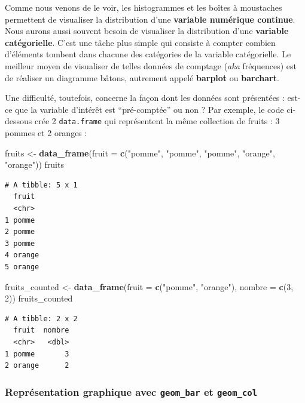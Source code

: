 \documentclass[
  a4paper,
]{article}
\newenvironment{Shaded}{\begin{snugshade}}{\end{snugshade}}
\newcommand{\DataTypeTok}[1]{\textcolor[rgb]{0.00,0.34,0.68}{#1}}
\newcommand{\DecValTok}[1]{\textcolor[rgb]{0.69,0.50,0.00}{#1}}
\newcommand{\KeywordTok}[1]{\textcolor[rgb]{0.12,0.11,0.11}{\textbf{#1}}}
\newcommand{\NormalTok}[1]{\textcolor[rgb]{0.12,0.11,0.11}{#1}}
\newcommand{\StringTok}[1]{\textcolor[rgb]{0.75,0.01,0.01}{#1}}
\begin{document}
Comme nous venons de le voir, les histogrammes et les boîtes à moustaches permettent de visualiser la distribution d'une \textbf{variable numérique continue}. Nous aurons aussi souvent besoin de visualiser la distribution d'une \textbf{variable catégorielle}. C'est une tâche plus simple qui consiste à compter combien d'éléments tombent dans chacune des catégories de la variable catégorielle. Le meilleur moyen de visualiser de telles données de comptage (\emph{aka} fréquences) est de réaliser un diagramme bâtons, autrement appelé \textbf{barplot} ou \textbf{barchart}.

Une difficulté, toutefois, concerne la façon dont les données sont présentées : est-ce que la variable d'intérêt est ``pré-comptée'' ou non ? Par exemple, le code ci-dessous crée 2 \texttt{data.frame} qui représentent la même collection de fruits : 3 pommes et 2 oranges :

\begin{Shaded}
\begin{Highlighting}[]
\NormalTok{fruits <-}\StringTok{ }\KeywordTok{data_frame}\NormalTok{(}\DataTypeTok{fruit =} \KeywordTok{c}\NormalTok{(}\StringTok{"pomme"}\NormalTok{, }\StringTok{"pomme"}\NormalTok{, }\StringTok{"pomme"}\NormalTok{, }\StringTok{"orange"}\NormalTok{, }\StringTok{"orange"}\NormalTok{))}
\NormalTok{fruits}
\end{Highlighting}
\end{Shaded}

\begin{verbatim}
# A tibble: 5 x 1
  fruit 
  <chr> 
1 pomme 
2 pomme 
3 pomme 
4 orange
5 orange
\end{verbatim}

\begin{Shaded}
\begin{Highlighting}[]
\NormalTok{fruits_counted <-}\StringTok{ }\KeywordTok{data_frame}\NormalTok{(}\DataTypeTok{fruit =} \KeywordTok{c}\NormalTok{(}\StringTok{"pomme"}\NormalTok{, }\StringTok{"orange"}\NormalTok{), }\DataTypeTok{nombre =} \KeywordTok{c}\NormalTok{(}\DecValTok{3}\NormalTok{, }
    \DecValTok{2}\NormalTok{))}
\NormalTok{fruits_counted}
\end{Highlighting}
\end{Shaded}

\begin{verbatim}
# A tibble: 2 x 2
  fruit  nombre
  <chr>   <dbl>
1 pomme       3
2 orange      2
\end{verbatim}

\hypertarget{repruxe9sentation-graphique-avec-geom_bar-et-geom_col}{%
\subsubsection{\texorpdfstring{Représentation graphique avec \texttt{geom\_bar} et \texttt{geom\_col}}{Représentation graphique avec geom\_bar et geom\_col}}\label{repruxe9sentation-graphique-avec-geom_bar-et-geom_col}}
\end{document}
